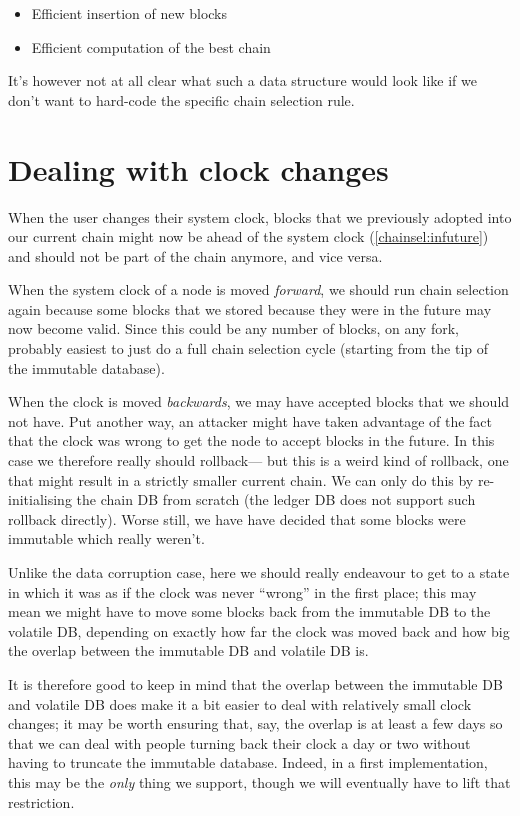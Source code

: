 \begin{itemize}
\item Efficient insertion of new blocks
\item Efficient computation of the best chain
\end{itemize}

It's however not at all clear what such a data structure would look like if we
don't want to hard-code the specific chain selection rule.

\section{Dealing with clock changes}
\label{future:clockchanges}

When the user changes their system clock, blocks that we previously adopted
into our current chain might now be ahead of the system clock (\cref{chainsel:infuture}) and should not
be part of the chain anymore, and vice versa.

When the system clock of a node is moved \emph{forward}, we should run chain
selection again because some blocks that we stored because they were in the
future may now become valid. Since this could be any number of blocks, on any
fork, probably easiest to just do a full chain selection cycle (starting from
the tip of the immutable database).

When the clock is moved \emph{backwards}, we may have accepted blocks that we
should not have. Put another way, an attacker might have taken advantage of the
fact that the clock was wrong to get the node to accept blocks in the future. In
this case we therefore really should rollback--- but this is a weird kind of
rollback, one that might result in a strictly smaller current chain. We can only
do this by re-initialising the chain DB from scratch (the ledger DB does not
support such rollback directly). Worse still, we have have decided that some
blocks were immutable which really weren't.

Unlike the data corruption case, here we should really endeavour to get to a
state in which it was as if the clock was never ``wrong'' in the first place;
this may mean we might have to move some blocks back from the immutable DB to
the volatile DB, depending on exactly how far the clock was moved back and how
big the overlap between the immutable DB and volatile DB is.

It is therefore good to keep in mind that the overlap between the immutable DB
and volatile DB does make it a bit easier to deal with relatively small clock
changes; it may be worth ensuring that, say, the overlap is at least a few days
so that we can deal with people turning back their clock a day or two without
having to truncate the immutable database. Indeed, in a first implementation,
this may be the \emph{only} thing we support, though we will eventually have to
lift that restriction.


